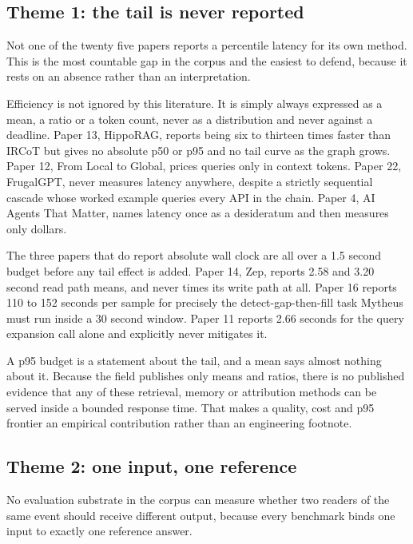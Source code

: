 \subsection{Theme 1: the tail is never reported}

Not one of the twenty five papers reports a percentile latency for its own
method. This is the most countable gap in the corpus and the easiest to
defend, because it rests on an absence rather than an interpretation.

Efficiency is not ignored by this literature. It is simply always expressed as
a mean, a ratio or a token count, never as a distribution and never against a
deadline. Paper 13, HippoRAG, reports being six to thirteen times faster than
IRCoT but gives no absolute p50 or p95 and no tail curve as the graph grows.
Paper 12, From Local to Global, prices queries only in context tokens. Paper
22, FrugalGPT, never measures latency anywhere, despite a strictly sequential
cascade whose worked example queries every API in the chain. Paper 4, AI
Agents That Matter, names latency once as a desideratum and then measures only
dollars.

The three papers that do report absolute wall clock are all over a 1.5 second
budget before any tail effect is added. Paper 14, Zep, reports 2.58 and 3.20
second read path means, and never times its write path at all. Paper 16 reports
110 to 152 seconds per sample for precisely the detect-gap-then-fill task
Mytheus must run inside a 30 second window. Paper 11 reports 2.66 seconds for
the query expansion call alone and explicitly never mitigates it.

\begin{takeaway}
A p95 budget is a statement about the tail, and a mean says almost nothing
about it. Because the field publishes only means and ratios, there is no
published evidence that any of these retrieval, memory or attribution methods
can be served inside a bounded response time. That makes a quality, cost and
p95 frontier an empirical contribution rather than an engineering footnote.
\end{takeaway}

\subsection{Theme 2: one input, one reference}

No evaluation substrate in the corpus can measure whether two readers of the
same event should receive different output, because every benchmark binds one
input to exactly one reference answer.

